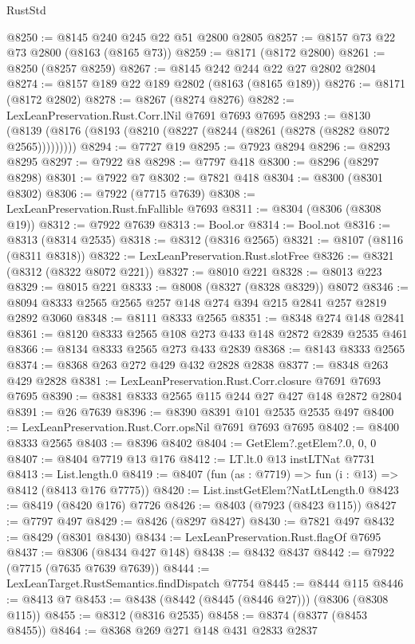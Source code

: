 \begin{lexlean}{RustStd}
\begin{coremodule}
@8250 := @8145 @240 @245 @22 @51 @2800 @2805
@8257 := @8157 @73 @22 @73 @2800 (@8163 (@8165 @73))
@8259 := @8171 (@8172 @2800)
@8261 := @8250 (@8257 @8259)
@8267 := @8145 @242 @244 @22 @27 @2802 @2804
@8274 := @8157 @189 @22 @189 @2802 (@8163 (@8165 @189))
@8276 := @8171 (@8172 @2802)
@8278 := @8267 (@8274 @8276)
@8282 := LexLeanPreservation.Rust.Corr.lNil @7691 @7693 @7695
@8293 := @8130 (@8139 (@8176 (@8193 (@8210 (@8227 (@8244 (@8261 (@8278 (@8282 @8072 @2565)))))))))
@8294 := @7727 @19
@8295 := @7923 @8294
@8296 := @8293 @8295
@8297 := @7922 @8
@8298 := @7797 @418
@8300 := @8296 (@8297 @8298)
@8301 := @7922 @7
@8302 := @7821 @418
@8304 := @8300 (@8301 @8302)
@8306 := @7922 (@7715 @7639)
@8308 := LexLeanPreservation.Rust.fnFallible @7693
@8311 := @8304 (@8306 (@8308 @19))
@8312 := @7922 @7639
@8313 := Bool.or
@8314 := Bool.not
@8316 := @8313 (@8314 @2535)
@8318 := @8312 (@8316 @2565)
@8321 := @8107 (@8116 (@8311 @8318))
@8322 := LexLeanPreservation.Rust.slotFree
@8326 := @8321 (@8312 (@8322 @8072 @221))
@8327 := @8010 @221
@8328 := @8013 @223
@8329 := @8015 @221
@8333 := @8008 (@8327 (@8328 @8329)) @8072
@8346 := @8094 @8333 @2565 @2565 @257 @148 @274 @394 @215 @2841 @257 @2819 @2892 @3060
@8348 := @8111 @8333 @2565
@8351 := @8348 @274 @148 @2841
@8361 := @8120 @8333 @2565 @108 @273 @433 @148 @2872 @2839 @2535 @461
@8366 := @8134 @8333 @2565 @273 @433 @2839
@8368 := @8143 @8333 @2565
@8374 := @8368 @263 @272 @429 @432 @2828 @2838
@8377 := @8348 @263 @429 @2828
@8381 := LexLeanPreservation.Rust.Corr.closure @7691 @7693 @7695
@8390 := @8381 @8333 @2565 @115 @244 @27 @427 @148 @2872 @2804
@8391 := @26 @7639
@8396 := @8390 @8391 @101 @2535 @2535 @497
@8400 := LexLeanPreservation.Rust.Corr.opsNil @7691 @7693 @7695
@8402 := @8400 @8333 @2565
@8403 := @8396 @8402
@8404 := GetElem?.getElem?.{0, 0, 0}
@8407 := @8404 @7719 @13 @176
@8412 := LT.lt.{0} @13 instLTNat @7731
@8413 := List.length.{0}
@8419 := @8407 (fun (as : @7719) => fun (i : @13) => @8412 (@8413 @176 @7775))
@8420 := List.instGetElem?NatLtLength.{0}
@8423 := @8419 (@8420 @176) @7726
@8426 := @8403 (@7923 (@8423 @115))
@8427 := @7797 @497
@8429 := @8426 (@8297 @8427)
@8430 := @7821 @497
@8432 := @8429 (@8301 @8430)
@8434 := LexLeanPreservation.Rust.flagOf @7695
@8437 := @8306 (@8434 @427 @148)
@8438 := @8432 @8437
@8442 := @7922 (@7715 (@7635 @7639 @7639))
@8444 := LexLeanTarget.RustSemantics.findDispatch @7754
@8445 := @8444 @115
@8446 := @8413 @7
@8453 := @8438 (@8442 (@8445 (@8446 @27))) (@8306 (@8308 @115))
@8455 := @8312 (@8316 @2535)
@8458 := @8374 (@8377 (@8453 @8455))
@8464 := @8368 @269 @271 @148 @431 @2833 @2837

\end{coremodule}
\end{lexlean}
